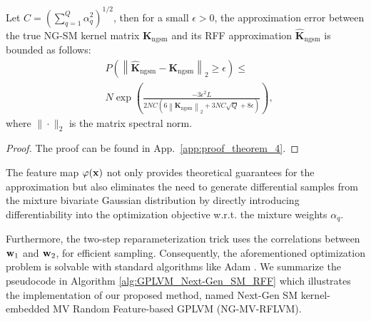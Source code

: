 \vspace{0.02in}
\begin{theorem}
\label{thm:NGSM_RFF_approx}
Let $C=(\sum_{q=1}^Q \alpha_q^2)^{1/2}$, then for a small $\epsilon>0$, the approximation error between the true NG-SM kernel matrix $\mathbf{K}_{\mathrm{ngsm}}$ and its RFF approximation $\hat{\mathbf{K}}_{\mathrm{ngsm}}$ is bounded as follows:
\begin{equation}
    \nonumber
    \begin{aligned}
    & P\left(\left\|\hat{\mathbf{K}}_{\mathrm{ngsm}}-\mathbf{K}_{\mathrm{ngsm}}\right\|_2 \geq \epsilon\right) \leq \\
    & N \exp \left(\frac{-3 \epsilon^2 L}{2 NC \left(6\left\|\mathbf{K}_{\mathrm{ngsm}}\right\|_2+ 3 N C \sqrt{Q}+8 \epsilon\right)}\right),
    \end{aligned}
\end{equation}
where $\|\cdot\|_2$ is the matrix spectral norm.  
\end{theorem}
\vspace{-0.08in}
\begin{proof}
    The proof can be found in App.~\ref{app:proof_theorem_4}. 
\end{proof}
\vspace{-0.08in}
The feature map \(\varphi({\mathbf x})\) not only provides theoretical guarantees for the approximation but also eliminates the need to generate differential samples from the mixture bivariate Gaussian distribution by directly introducing differentiability into the optimization objective w.r.t. the mixture weights \(\alpha_q\). 

Furthermore, the two-step reparameterization trick uses the correlations between \({\mathbf w}_1\) and \({\mathbf w}_2\), for efficient sampling. %
Consequently, the aforementioned optimization problem is solvable with standard algorithms like Adam \citep{kingma2013auto}. We summarize the pseudocode in Algorithm \ref{alg:GPLVM_Next-Gen_SM_RFF} which illustrates the implementation of our proposed method, named \MakeUppercase{n}ext-\MakeUppercase{g}en SM kernel-embedded \MakeUppercase{mv} \MakeUppercase{r}andom \MakeUppercase{f}eature-based GPLVM  (\MakeUppercase{ng}-\MakeUppercase{mv-rflvm}).  




